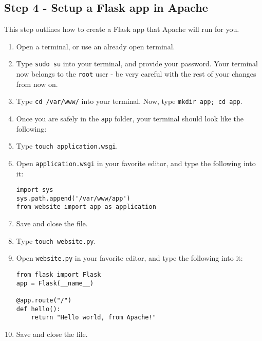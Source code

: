 \documentclass{article}
\begin{document}
\subsection{Step 4 - Setup a Flask app in Apache}
This step outlines how to create a Flask app that Apache will run for you.
\begin{enumerate}
\item Open a terminal, or use an already open terminal.
\item Type \verb+sudo su+ into your terminal, and provide your password. Your terminal
now belongs to the \verb+root+ user - be very careful with the rest of your changes
from now on.
\item Type \verb+cd /var/www/+ into your terminal. Now, type \verb+mkdir app; cd app+.
\item Once you are safely in the \verb+app+ folder, your terminal should look like the following:
\item Type \verb+touch application.wsgi+.
\item Open \verb+application.wsgi+ in your favorite editor, and type the following into it:
\begin{verbatim}
import sys
sys.path.append('/var/www/app')
from website import app as application
\end{verbatim}
\item Save and close the file.
\item Type \verb+touch website.py+.
\item Open \verb+website.py+ in  your favorite editor, and type the following into it:
\begin{verbatim}
from flask import Flask
app = Flask(__name__)

@app.route("/")
def hello():
    return "Hello world, from Apache!"
\end{verbatim}
\item Save and close the file.
\end{enumerate}
\end{document}
